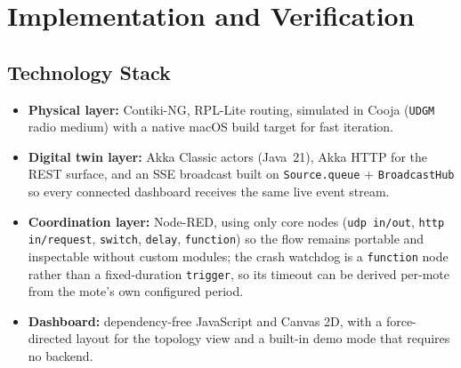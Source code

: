 \section{Implementation and Verification}

\subsection*{Technology Stack}
\begin{itemize}
\item \textbf{Physical layer:} Contiki-NG, RPL-Lite routing, simulated in Cooja
  (\texttt{UDGM} radio medium) with a native macOS build target for fast iteration.
\item \textbf{Digital twin layer:} Akka Classic actors (Java~21), Akka HTTP for the REST
  surface, and an SSE broadcast built on \texttt{Source.queue} + \texttt{BroadcastHub} so
  every connected dashboard receives the same live event stream.
\item \textbf{Coordination layer:} Node-RED, using only core nodes (\texttt{udp in/out},
  \texttt{http in/request}, \texttt{switch}, \texttt{delay}, \texttt{function}) so the flow
  remains portable and inspectable without custom modules; the crash watchdog is a
  \texttt{function} node rather than a fixed-duration \texttt{trigger}, so its timeout can be
  derived per-mote from the mote's own configured period.
\item \textbf{Dashboard:} dependency-free JavaScript and Canvas 2D, with a force-directed
  layout for the topology view and a built-in demo mode that requires no backend.
\end{itemize}

